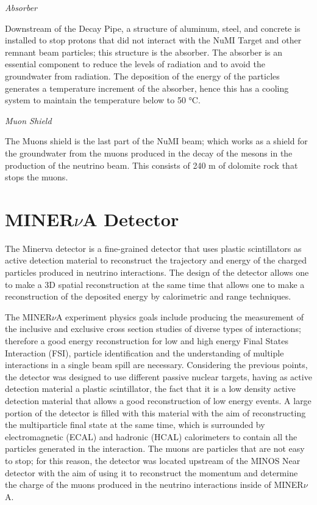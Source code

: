 \textit{Absorber}

Downstream of the Decay Pipe, a structure of aluminum, steel, and concrete is installed to stop protons that did not interact with the NuMI Target and other remnant beam particles; this structure is the absorber. The absorber is an essential component to reduce the levels of radiation and to avoid the groundwater from radiation. The deposition of the energy of the particles generates a temperature increment of the absorber, hence this has a cooling system to maintain the temperature below to 50 °C. 

\textit{Muon Shield} 

The Muons shield is the last part of the NuMI beam; which works as a shield for the groundwater from the muons produced in the decay of the mesons in the production of the neutrino beam. This consists of 240 m of dolomite rock that stops the muons. 

\pagebreak



\section{MINER$\nu$A Detector}
\label{Cap:MnvExp:MnvDetector}

The Minerva detector is a fine-grained detector that uses plastic scintillators as active detection material to reconstruct the trajectory and energy of the charged particles produced in neutrino interactions. The design of the detector allows one to make a 3D spatial reconstruction at the same time that allows one to make a reconstruction of the deposited energy by calorimetric and range techniques. 

The MINER$\nu$A experiment physics goals include producing the measurement of the inclusive and exclusive cross section studies of diverse types of interactions; therefore a good energy reconstruction for low and high energy Final States Interaction (FSI), particle identification and the understanding of multiple interactions in a single beam spill are necessary. Considering the previous points, the detector was designed to use different passive nuclear targets, having as active detection material a plastic scintillator, the fact that it is a low density active detection material that allows a good reconstruction of low energy events. A large portion of the detector is filled with this material with the aim of reconstructing the multiparticle final state at the same time, which is surrounded by electromagnetic (ECAL) and hadronic (HCAL) calorimeters to contain all the particles generated in the interaction. The muons are particles that are not easy to stop; for this reason, the detector was located upstream of the MINOS Near detector with the aim of using it to reconstruct the momentum and determine the charge of the muons produced in the neutrino interactions inside of MINER$\nu$A.


